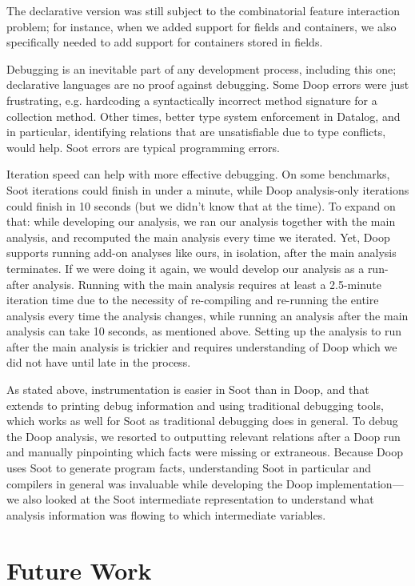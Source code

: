 The declarative version was still subject to the combinatorial feature interaction problem; for instance, when we added support for fields and containers, we also specifically needed to add support for containers stored in fields.

Debugging is an inevitable part of any development process, including this one; declarative languages are no proof against debugging. Some Doop errors were just frustrating, e.g. hardcoding a syntactically incorrect method signature for a collection method. Other times, better type system enforcement in Datalog, and in particular, identifying relations that are unsatisfiable due to type conflicts, would help. Soot errors are typical programming errors.

Iteration speed can help with more effective debugging. On some benchmarks, Soot iterations could finish in under a minute, while Doop analysis-only iterations could finish in 10 seconds (but we didn't know that at the time). To expand on that: while developing our analysis, we ran our analysis together with the main analysis, and recomputed the main analysis every time we iterated. Yet, Doop supports running add-on analyses like ours, in isolation, after the main analysis terminates. If we were doing it again, we would develop our analysis as a run-after analysis. Running with the main analysis requires at least a 2.5-minute iteration time due to the necessity of re-compiling and re-running the entire analysis every time the analysis changes, while running an analysis after the main analysis can take 10 seconds, as mentioned above. Setting up the analysis to run after the main analysis is trickier and requires understanding of Doop which we did not have until late in the process. 

As stated above, instrumentation is easier in Soot than in Doop, and that extends to printing debug information and using traditional debugging tools, which works as well for Soot as traditional debugging does in general. To debug the Doop analysis, we resorted to outputting relevant relations after a Doop run and manually pinpointing which facts were missing or extraneous. Because Doop uses Soot to generate program facts, understanding Soot in particular and compilers in general was invaluable while developing the Doop implementation---we also looked at the Soot intermediate representation to understand what analysis information was flowing to which intermediate variables.

\section{Future Work} 

